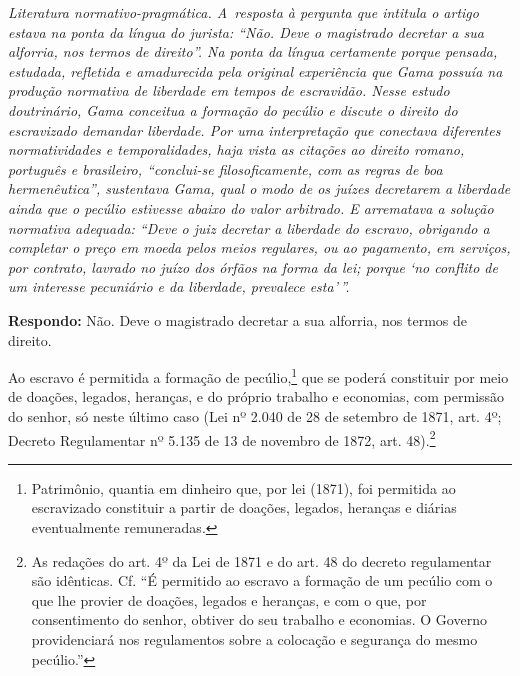 {\begin{resumo}
\emph{Literatura normativo-pragmática. A~resposta à pergunta que
intitula o artigo estava na ponta da língua do jurista: ``Não. Deve o
magistrado decretar a sua alforria, nos termos de direito''. Na ponta
da língua certamente porque pensada, estudada, refletida e amadurecida pela
original experiência que Gama possuía na produção normativa de liberdade
em tempos de escravidão. Nesse estudo doutrinário, Gama conceitua a
formação do pecúlio e discute o direito do escravizado demandar
liberdade. Por uma interpretação que conectava diferentes normatividades
e temporalidades, haja vista as citações ao direito romano, português e
brasileiro, ``conclui-se filosoficamente, com as regras de boa
hermenêutica'', sustentava Gama, qual o modo de os juízes decretarem a
liberdade ainda que o pecúlio estivesse abaixo do valor arbitrado. E
arrematava a solução normativa adequada: ``Deve o juiz decretar a
liberdade do escravo, obrigando a completar o preço em moeda pelos meios
regulares, ou ao pagamento, em serviços, por contrato, lavrado no juízo
dos órfãos na forma da lei; porque `no conflito de um interesse
pecuniário e da liberdade, prevalece esta'\,''. }
\end{resumo}

\pagebreak

\textbf{Respondo:} Não. Deve o magistrado decretar a sua alforria, nos termos de direito.

\asterisc

Ao escravo é permitida a formação de pecúlio,\footnote{Patrimônio,
  quantia em dinheiro que, por lei (1871), foi permitida ao escravizado
  constituir a partir de doações, legados, heranças e diárias
  eventualmente remuneradas.} que se poderá constituir por meio de
doações, legados, heranças, e do próprio trabalho e economias, com
permissão do senhor, só neste último caso (Lei nº 2.040 de 28 de
setembro de 1871, art. 4º; Decreto Regulamentar nº 5.135 de
13 de novembro de 1872, art. 48).\footnote{As redações do art. 4º da
  Lei de 1871 e do art. 48 do decreto regulamentar são idênticas. Cf. ``É
  permitido ao escravo a formação de um pecúlio com o que lhe provier de
  doações, legados e heranças, e com o que, por consentimento do senhor,
  obtiver do seu trabalho e economias. O Governo providenciará nos
  regulamentos sobre a colocação e segurança do mesmo pecúlio.''}

}
